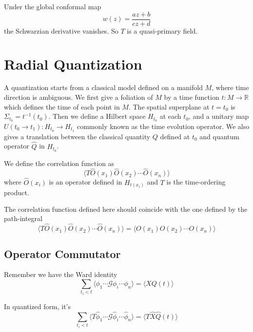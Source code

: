 \documentclass[12pt]{book}
\begin{document}
	Under the global conformal map
	\begin{equation}
		w(z)=\frac{az+b}{cz+d}
	\end{equation}
	the Schwarzian derivative vanishes. So $T$ is a quasi-primary field.
	\section{Radial Quantization}
	
	A quantization starts from a classical model defined on a manifold $M$, where time direction is ambiguous. We first give a foliation of $M$ by a time function $t:M\rightarrow \mathbb R$ which defines the time of each point in $M$. The spatial superplane at $t=t_0$ is $\Sigma_{t_0}=t^{-1}(t_0)$. Then we define a Hilbert space $H_{t_0}$ at each $t_0$, and a unitary map $U(t_0\rightarrow t_1):H_{t_0}\rightarrow H_{t_1}$ commonly known as the time evolution operator. We also gives a translation between the classical quantity $Q$ defined at $t_0$ and quantum operator $\hat Q$ in $H_{t_0}$.
	
	We define the correlation function as
	\begin{equation}
		\langle T\hat O(x_1)\hat O(x_2)\cdots \hat O(x_n) \rangle
	\end{equation}
	where $\hat O(x_i)$ is an operator defined in $H_{t(x_i)}$ and $T$ is the time-ordering product.
	
	The correlation function defined here should coincide with the one defined by the path-integral
	\begin{equation}
		\langle T\hat O(x_1)\hat O(x_2)\cdots \hat O(x_n) \rangle=\langle O(x_1) O(x_2)\cdots O(x_n)\rangle
	\end{equation}
	
	\subsection{Operator Commutator}
	
	Remember we have the Ward identity
	\begin{equation}
		\sum_{t_i<t}\langle\phi_1\cdots\mathcal G\phi_i\cdots\phi_n\rangle = \langle XQ(t)\rangle
	\end{equation}
	
	In quantized form, it's
	\begin{equation}
		\sum_{t_i<t}\langle T\hat \phi_1\cdots\mathcal G\hat \phi_i\cdots\hat \phi_n\rangle = \langle T\hat X\hat Q(t)\rangle
	\end{equation}
	
\end{document}
